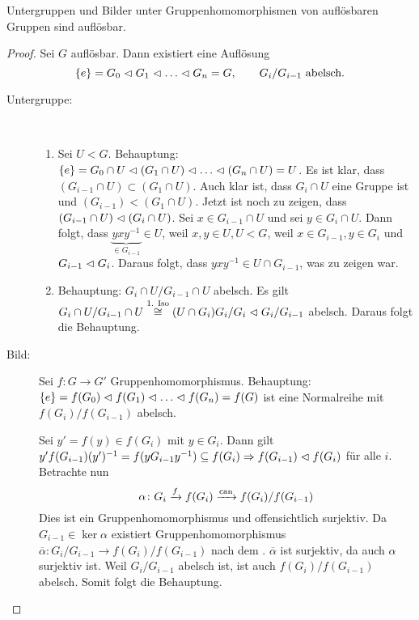 \documentclass[12pt,a4paper]{scrartcl}
\begin{document}
	\begin{satz}
		Untergruppen und Bilder unter Gruppenhomomorphismen von auflösbaren Gruppen sind auflösbar.
	\end{satz}
	\begin{proof}
		Sei $G$ auflösbar. Dann existiert eine Auflösung 
		\begin{equation*}
			\left\lbrace e\right\rbrace = G_0 \vartriangleleft G_1 \vartriangleleft \ldots \vartriangleleft G_n = G, \qquad  G_i/G_{i-1} \text{ abelsch.}
		\end{equation*}
		\begin{description}
			\item[Untergruppe:]~
				\begin{enumerate}
				\item Sei $U < G$. Behauptung: $\left\lbrace e\right\rbrace = G_0 \cap U \vartriangleleft (G_1 \cap U) \vartriangleleft \ldots \vartriangleleft (G_n \cap U) = U $. Es ist klar, dass $(G_{i-1} \cap U) \subset (G_1 \cap U)$. Auch klar ist, dass $G_i \cap U$ eine Gruppe ist und $(G_{i-1} ) < (G_1 \cap U)$. Jetzt ist noch zu zeigen, dass $(G_{i-1} \cap U) \vartriangleleft (G_i \cap U)$. Sei $x \in G_{i-1} \cap U$ und sei $y \in G_i \cap U$. Dann folgt, dass $\underbrace{yxy^{-1}}_{\in G_{i-1}} \in U$, weil $x, y \in U, U < G$, weil $x \in G_{i-1}, y \in G_i$ und $G_{i-1} \vartriangleleft G_i$. Daraus folgt, dass $yxy^{-1} \in U \cap G_{i-1}$, was zu zeigen war.
				\item Behauptung: $G_i \cap U / G_{i-1} \cap U$ abelsch. Es gilt $G_i \cap U / G_{i-1} \cap U \stackrel{\text{1. Iso}}{\cong} (U \cap G_i)G_i/G_i \vartriangleleft G_i/G_{i-1}$ abelsch. Daraus folgt die Behauptung.
			\end{enumerate}
			\item[Bild:]
				Sei $f\colon G\to G'$ Gruppenhomomorphismus. Behauptung: $\{e\} = f(G_0)\nt f(G_1)\nt \dots \nt f(G_n ) = f(G)$ ist eine Normalreihe mit $f(G_i)/f(G_{i-1})$ abelsch.
				
				Sei $y' = f(y)\in f(G_i)$ mit $y\in G_i$. Dann gilt $y'f(G_{i-1})(y')^{-1} = f(yG_{i-1}y^{-1})\subseteq f(G_i)\Rightarrow f(G_{i-1})\vartriangleleft f(G_i)$ für alle $i$. Betrachte nun 
$$\alpha\colon G_i\xrightarrow{f} f(G_i)\xrightarrow{\text{can}}f(G_i)/f(G_{i-1})$$ Dies ist ein Gruppenhomomorphismus und offensichtlich surjektiv. Da $G_{i-1}\in \ker \alpha$ existiert Gruppenhomomorphismus $\overline{\alpha}\colon G_i/G_{i-1}\to f(G_i)/f(G_{i-1})$ nach dem . $\overline{\alpha}$ ist surjektiv, da auch $\alpha$ surjektiv ist. Weil $G_i/G_{i-1}$ abelsch ist, ist auch $f(G_i)/f(G_{i-1})$ abelsch. Somit folgt die Behauptung.
		\end{description}
\end{proof}
\end{document}

